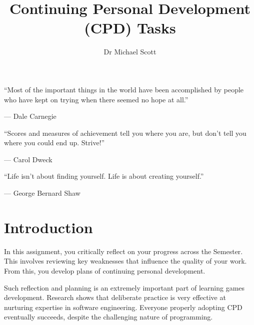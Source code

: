\documentclass{../fal_assignment}
\title{Continuing Personal Development (CPD) Tasks}
\author{Dr Michael Scott}
\begin{document}
\maketitle
%    
\begin{marginquote}
    ``Most of the important things in the world have been accomplished by people who have kept on trying when there seemed no hope at all.''
    
    --- Dale Carnegie

    \marginquoterule

    ``Scores and measures of achievement tell you where you are, but don't tell you where you could end up. Strive!''
    
    --- Carol Dweck
    
    \marginquoterule
    
    ``Life isn't about finding yourself. Life is about creating yourself.''
    
     --- George Bernard Shaw             
\end{marginquote}

\section*{Introduction}

In this assignment, you critically reflect on your progress across the Semester. This involves reviewing key weaknesses that influence the quality of your work. From this, you develop plans of continuing personal development.

Such reflection and planning is an extremely important part of learning games development. Research shows that deliberate practice is very effective at nurturing expertise in software engineering. Everyone properly adopting CPD eventually succeeds, despite the challenging nature of programming.
\end{document}
